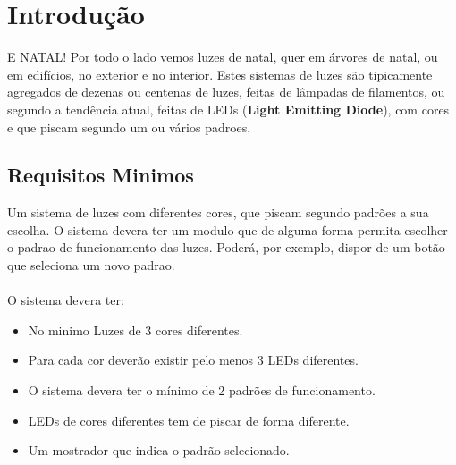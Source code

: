 \documentclass[12pt,a4paper,portrait]{article}
\begin{document}
	
	\tableofcontents
	
	
	\newpage
	\section{Introdução}
		E NATAL! Por todo o lado vemos luzes de natal, quer em  árvores de natal, ou em edifícios,
		no exterior e no interior. Estes sistemas de luzes são tipicamente agregados de dezenas ou	
		centenas de luzes, feitas de lâmpadas de filamentos, ou segundo a tendência atual, feitas de LEDs (\textbf{Light Emitting Diode}), com cores e que piscam segundo um ou vários padroes.\\
		\subsection{Requisitos Minimos}	
			Um sistema de luzes com diferentes cores, que piscam segundo padrões a sua	
			escolha. O sistema devera ter um modulo que de alguma forma permita escolher o padrao	
			de funcionamento das luzes. Poderá, por exemplo, dispor de um botão que seleciona um	
			novo padrao.\\\\
			O sistema devera ter:\\
			\begin{itemize}
				\item No minimo Luzes de 3 cores diferentes.
				\item Para cada cor deverão existir pelo menos 3 LEDs diferentes.
				\item O sistema devera ter o mínimo de 2 padrões de funcionamento.
				\item LEDs de cores diferentes tem de piscar de forma diferente.
				\item Um mostrador que indica o padrão selecionado.
			\end{itemize}
\end{document}
